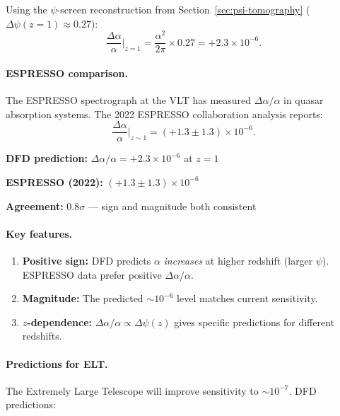 Using the $\psi$-screen reconstruction from Section~\ref{sec:psi-tomography} ($\Delta\psi(z=1) \approx 0.27$):
\begin{equation}
\frac{\Delta\alpha}{\alpha}\bigg|_{z=1} = \frac{\alpha^2}{2\pi} \times 0.27 = +2.3 \times 10^{-6}.
\end{equation}

\paragraph{ESPRESSO comparison.}
The ESPRESSO spectrograph at the VLT has measured $\Delta\alpha/\alpha$ in quasar absorption systems. 
The 2022 ESPRESSO collaboration analysis reports:
\begin{equation}
\frac{\Delta\alpha}{\alpha}\bigg|_{z \sim 1} = (+1.3 \pm 1.3) \times 10^{-6}.
\end{equation}

\begin{tcolorbox}[colback=green!5!white, colframe=green!60!black, title=$\alpha(z)$ Prediction vs.\ ESPRESSO]
\textbf{DFD prediction:} $\Delta\alpha/\alpha = +2.3 \times 10^{-6}$ at $z = 1$

\textbf{ESPRESSO (2022):} $(+1.3 \pm 1.3) \times 10^{-6}$

\textbf{Agreement:} $0.8\sigma$ --- sign and magnitude both consistent
\end{tcolorbox}

\paragraph{Key features.}
\begin{enumerate}
\item \textbf{Positive sign:} DFD predicts $\alpha$ \textit{increases} at higher redshift (larger $\psi$). 
      ESPRESSO data prefer positive $\Delta\alpha/\alpha$.
\item \textbf{Magnitude:} The predicted $\sim 10^{-6}$ level matches current sensitivity.
\item \textbf{$z$-dependence:} $\Delta\alpha/\alpha \propto \Delta\psi(z)$ gives specific predictions for different redshifts.
\end{enumerate}

\paragraph{Predictions for ELT.}
The Extremely Large Telescope will improve sensitivity to $\sim 10^{-7}$. DFD predictions:


